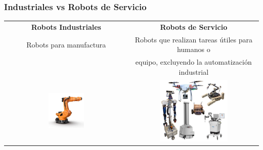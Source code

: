 \documentclass[10pt,spanish,aspectratio=1610]{beamer}
\begin{document}
\begin{frame}\frametitle{Industriales vs Robots de Servicio}
  \centering
  \begin{tabular}{cc}
    \textbf{Robots Industriales} & \textbf{Robots de Servicio}\\
    Robots para manufactura &  Robots que realizan tareas útiles para humanos o\\
     & equipo, excluyendo la automatización industrial\\
    \includegraphics[width=0.3\textwidth]{Figures/IndustrialRobot.jpg} & \includegraphics[width=0.55\textwidth]{Figures/ServiceRobots.png}
  \end{tabular}
\end{frame}
\end{document}
